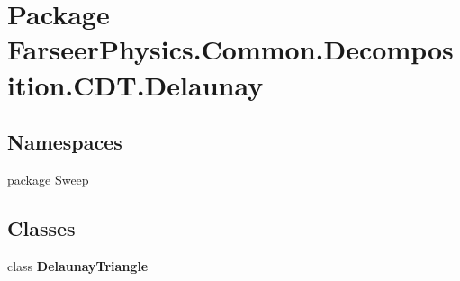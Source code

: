 \hypertarget{namespace_farseer_physics_1_1_common_1_1_decomposition_1_1_c_d_t_1_1_delaunay}{\section{Package Farseer\+Physics.\+Common.\+Decomposition.\+C\+D\+T.\+Delaunay}
\label{namespace_farseer_physics_1_1_common_1_1_decomposition_1_1_c_d_t_1_1_delaunay}
}
\subsection*{Namespaces}
\begin{DoxyCompactItemize}
\item 
package \hyperlink{namespace_farseer_physics_1_1_common_1_1_decomposition_1_1_c_d_t_1_1_delaunay_1_1_sweep}{Sweep}
\end{DoxyCompactItemize}
\subsection*{Classes}
\begin{DoxyCompactItemize}
\item 
class {\bfseries Delaunay\+Triangle}
\end{DoxyCompactItemize}
